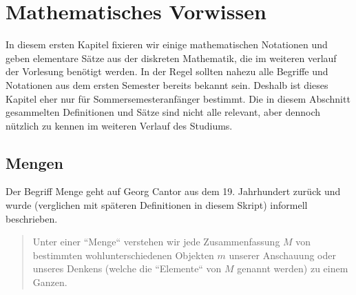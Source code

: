\documentclass[11pt, a4paper]{article}
\theoremstyle{definition}
\theoremstyle{plain}
\numberwithin{equation}{section}
\begin{document}
\newpage
\tableofcontents


\newpage
\pagestyle{headings}
\section{Mathematisches Vorwissen}\label{sec:pre}
In diesem ersten Kapitel fixieren wir einige mathematischen Notationen und geben elementare Sätze aus der diskreten Mathematik, die im weiteren verlauf der Vorlesung benötigt werden. In der Regel sollten nahezu alle Begriffe und Notationen aus dem ersten Semester bereits bekannt sein. Deshalb ist dieses Kapitel eher nur für Sommersemesteranfänger bestimmt. Die in diesem Abschnitt gesammelten Definitionen und Sätze sind nicht alle relevant, aber dennoch nützlich zu kennen im weiteren Verlauf des Studiums.


\subsection{Mengen}\label{sec:pre_sets}
Der Begriff Menge geht auf Georg Cantor aus dem 19. Jahrhundert zurück und wurde (verglichen mit späteren Definitionen in diesem Skript) informell beschrieben.
\begin{quote}
	Unter einer ``Menge`` verstehen wir jede Zusammenfassung \( M \) von bestimmten wohlunterschiedenen Objekten \( m \) unserer Anschauung oder unseres Denkens (welche die ``Elemente`` von \( M \) genannt werden) zu einem Ganzen.
\end{quote}
\end{document}

